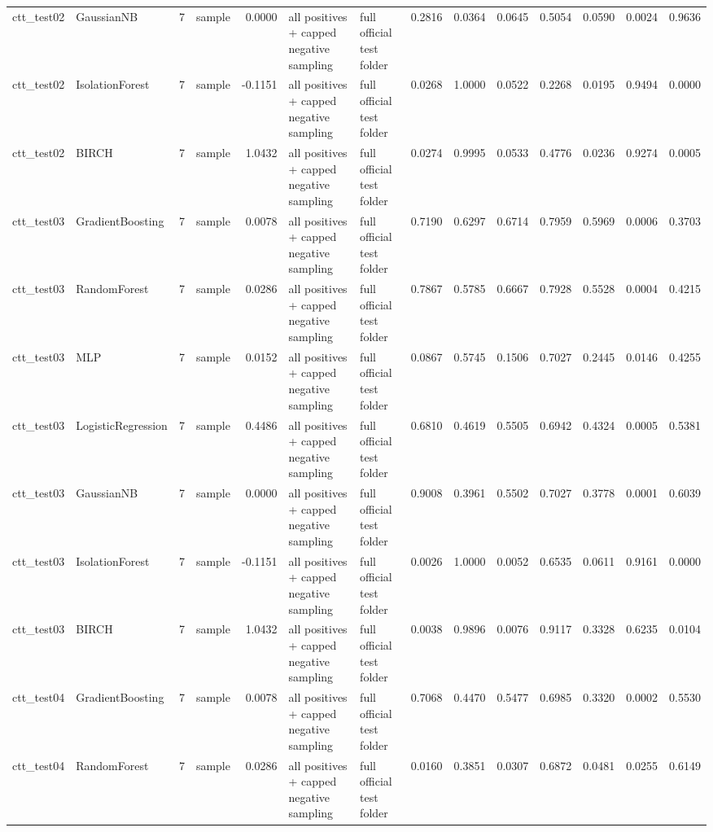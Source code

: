 \begin{tabular}{llrlrllrrrrrrr}
ctt\_test02 & GaussianNB & 7 & sample & 0.0000 & all positives + capped negative sampling & full official test folder & 0.2816 & 0.0364 & 0.0645 & 0.5054 & 0.0590 & 0.0024 & 0.9636 \\
ctt\_test02 & IsolationForest & 7 & sample & -0.1151 & all positives + capped negative sampling & full official test folder & 0.0268 & 1.0000 & 0.0522 & 0.2268 & 0.0195 & 0.9494 & 0.0000 \\
ctt\_test02 & BIRCH & 7 & sample & 1.0432 & all positives + capped negative sampling & full official test folder & 0.0274 & 0.9995 & 0.0533 & 0.4776 & 0.0236 & 0.9274 & 0.0005 \\
ctt\_test03 & GradientBoosting & 7 & sample & 0.0078 & all positives + capped negative sampling & full official test folder & 0.7190 & 0.6297 & 0.6714 & 0.7959 & 0.5969 & 0.0006 & 0.3703 \\
ctt\_test03 & RandomForest & 7 & sample & 0.0286 & all positives + capped negative sampling & full official test folder & 0.7867 & 0.5785 & 0.6667 & 0.7928 & 0.5528 & 0.0004 & 0.4215 \\
ctt\_test03 & MLP & 7 & sample & 0.0152 & all positives + capped negative sampling & full official test folder & 0.0867 & 0.5745 & 0.1506 & 0.7027 & 0.2445 & 0.0146 & 0.4255 \\
ctt\_test03 & LogisticRegression & 7 & sample & 0.4486 & all positives + capped negative sampling & full official test folder & 0.6810 & 0.4619 & 0.5505 & 0.6942 & 0.4324 & 0.0005 & 0.5381 \\
ctt\_test03 & GaussianNB & 7 & sample & 0.0000 & all positives + capped negative sampling & full official test folder & 0.9008 & 0.3961 & 0.5502 & 0.7027 & 0.3778 & 0.0001 & 0.6039 \\
ctt\_test03 & IsolationForest & 7 & sample & -0.1151 & all positives + capped negative sampling & full official test folder & 0.0026 & 1.0000 & 0.0052 & 0.6535 & 0.0611 & 0.9161 & 0.0000 \\
ctt\_test03 & BIRCH & 7 & sample & 1.0432 & all positives + capped negative sampling & full official test folder & 0.0038 & 0.9896 & 0.0076 & 0.9117 & 0.3328 & 0.6235 & 0.0104 \\
ctt\_test04 & GradientBoosting & 7 & sample & 0.0078 & all positives + capped negative sampling & full official test folder & 0.7068 & 0.4470 & 0.5477 & 0.6985 & 0.3320 & 0.0002 & 0.5530 \\
ctt\_test04 & RandomForest & 7 & sample & 0.0286 & all positives + capped negative sampling & full official test folder & 0.0160 & 0.3851 & 0.0307 & 0.6872 & 0.0481 & 0.0255 & 0.6149 \\

\end{tabular}
